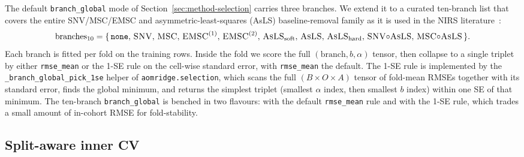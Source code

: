\documentclass[11pt,a4paper]{article}
\newcommand{\SNV}{\textsc{SNV}\xspace}
\newcommand{\MSC}{\textsc{MSC}\xspace}
\newcommand{\EMSC}{\textsc{EMSC}\xspace}
\newcommand{\AsLS}{\textsc{AsLS}\xspace}
\begin{document}
The default \texttt{branch\_global} mode of
Section~\ref{sec:method-selection} carries three branches. We extend
it to a curated ten-branch list that covers the entire SNV/MSC/EMSC
and asymmetric-least-squares (AsLS) baseline-removal family as it is
used in the NIRS literature~\citep{barnes1989snv, geladi1985msc,
beurier2026aompls}:
\begin{equation*}
\mathrm{branches}_{10} = \{\,\texttt{none},\,\SNV,\,\MSC,\,\EMSC^{(1)},\,\EMSC^{(2)},\,
\AsLS_{\mathrm{soft}},\,\AsLS,\,\AsLS_{\mathrm{hard}},\,\SNV{\circ}\AsLS,\,\MSC{\circ}\AsLS\,\}.
\end{equation*}
Each branch is fitted per fold on the training rows. Inside the fold
we score the full $(\mathrm{branch}, b, \alpha)$ tensor, then collapse
to a single triplet by either \texttt{rmse\_mean} or the 1-SE rule on
the cell-wise standard error, with \texttt{rmse\_mean} the default.
The 1-SE rule is implemented by the \texttt{\_branch\_global\_pick\_1se}
helper of \texttt{aomridge.selection}, which scans the full
$(B \times O \times A)$ tensor of fold-mean RMSEs together with its
standard error, finds the global minimum, and returns the simplest
triplet (smallest $\alpha$ index, then smallest $b$ index) within one
SE of that minimum. The ten-branch \texttt{branch\_global} is benched
in two flavours: with the default \texttt{rmse\_mean} rule and with
the 1-SE rule, which trades a small amount of in-cohort RMSE for
fold-stability.

\subsection{Split-aware inner CV}\label{sec:method-splitaware}
\end{document}
